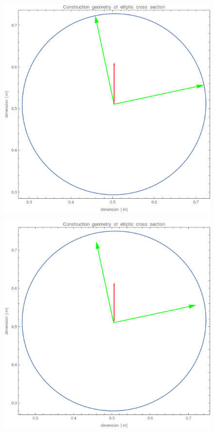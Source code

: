 \documentclass[twocolumn]{bmcart}
\begin{document}
\begin{figure}[h]
\begin{minipage}{.26\textwidth}
  \centering
  \includegraphics[width=1\linewidth]{figures/V3.png}
  \label{fig:sfig1}
\end{minipage}%
\begin{minipage}{.26\textwidth}
  \centering
  \includegraphics[width=1\linewidth]{figures/V2.png}

\end{minipage}
\end{figure}
\end{document}
